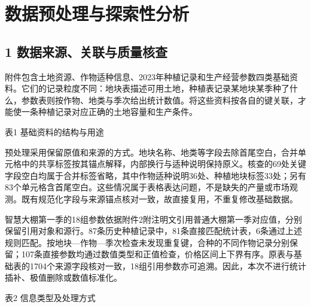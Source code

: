 \documentclass[11pt,a4paper]{article}
\begin{document}
\section*{数据预处理与探索性分析}
\subsection*{1 数据来源、关联与质量核查}
附件包含土地资源、作物适种信息、2023年种植记录和生产经营参数四类基础资料。它们的记录粒度不同：地块表描述可用土地，种植表记录某地块某季种了什么，参数表则按作物、地类与季次给出统计数值。将这些资料按各自的键关联，才能使一条种植记录对应正确的土地容量和生产条件。\par
{\centering\small 表1 基础资料的结构与用途\par}\nopagebreak\smallskip
\par{}\par\medskip
预处理采用保留原值和来源的方式。地块名称、地类等字段去除首尾空白，合并单元格中的共享标签按其锚点解释，内部换行与适种说明保持原义。核查的69处关键字段空白均属于合并标签省略，其中作物适种说明36处、种植地块标签33处；另有83个单元格含首尾空白。这些情况属于表格表达问题，不是缺失的产量或市场观测。既有规范化字段与来源锚点核对一致，故直接复用，不重复修改基础数据。\par
智慧大棚第一季的18组参数依据附件2附注明文引用普通大棚第一季对应值，分别保留引用对象和源行。87条历史种植记录中，81条直接匹配统计表，6条通过上述规则匹配。按地块—作物—季次检查未发现重复键，合种的不同作物记录分别保留；107条直接参数均通过数值类型和正值检查，价格区间上下界有序。原表与基础表的1704个来源字段核对一致，18组引用参数亦可追溯。因此，本次不进行统计插补、极值删除或数值标准化。\par
{\centering\small 表2 信息类型及处理方式\par}\nopagebreak\smallskip
\end{document}

